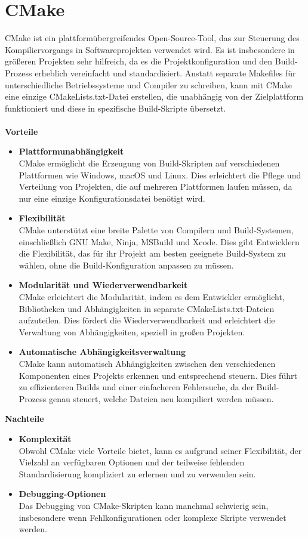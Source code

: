 \section{CMake}
\label{sec:tooling-cmake}
CMake ist ein plattformübergreifendes Open-Source-Tool, das zur Steuerung des Kompiliervorgangs in Softwareprojekten verwendet wird.
Es ist insbesondere in größeren Projekten sehr hilfreich, da es die Projektkonfiguration und den Build-Prozess erheblich vereinfacht und standardisiert.
Anstatt separate Makefiles für unterschiedliche Betriebssysteme und Compiler zu schreiben, kann mit CMake eine einzige CMakeLists.txt-Datei erstellen, die unabhängig von der Zielplattform funktioniert und diese in spezifische Build-Skripte übersetzt.\\\\
\textbf{Vorteile}
\begin{itemize}
    \item \textbf{Plattformunabhängigkeit}\\
    CMake ermöglicht die Erzeugung von Build-Skripten auf verschiedenen Plattformen wie Windows, macOS und Linux.
    Dies erleichtert die Pflege und Verteilung von Projekten, die auf mehreren Plattformen laufen müssen, da nur eine einzige Konfigurationsdatei benötigt wird.
    \item \textbf{Flexibilität}\\
    CMake unterstützt eine breite Palette von Compilern und Build-Systemen, einschließlich GNU Make, Ninja, MSBuild und Xcode.
    Dies gibt Entwicklern die Flexibilität, das für ihr Projekt am besten geeignete Build-System zu wählen, ohne die Build-Konfiguration anpassen zu müssen.
    \item \textbf{Modularität und Wiederverwendbarkeit}\\
    CMake erleichtert die Modularität, indem es dem Entwickler ermöglicht, Bibliotheken und Abhängigkeiten in separate CMakeLists.txt-Dateien aufzuteilen.
    Dies fördert die Wiederverwendbarkeit und erleichtert die Verwaltung von Abhängigkeiten, speziell in großen Projekten.
    \item \textbf{Automatische Abhängigkeitsverwaltung}\\
    CMake kann automatisch Abhängigkeiten zwischen den verschiedenen Komponenten eines Projekts erkennen und entsprechend steuern.
    Dies führt zu effizienteren Builds und einer einfacheren Fehlersuche, da der Build-Prozess genau steuert, welche Dateien neu kompiliert werden müssen.
\end{itemize}
\textbf{Nachteile}
\begin{itemize}
    \item \textbf{Komplexität}\\
    Obwohl CMake viele Vorteile bietet, kann es aufgrund seiner Flexibilität, der Vielzahl an verfügbaren Optionen und der teilweise fehlenden Standardisierung kompliziert zu erlernen und zu verwenden sein.
    \item \textbf{Debugging-Optionen}\\
    Das Debugging von CMake-Skripten kann manchmal schwierig sein, insbesondere wenn Fehlkonfigurationen oder komplexe Skripte verwendet werden.
\end{itemize}

